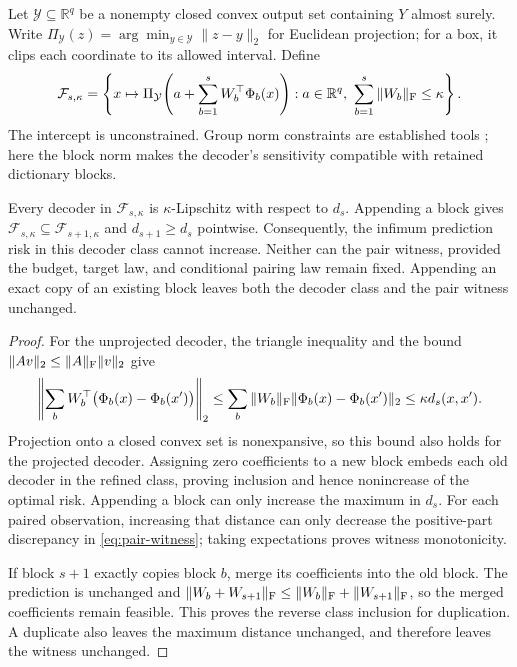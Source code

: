 Let $\mathcal Y\subseteq\mathbb R^q$ be a nonempty closed convex output
set containing $Y$ almost surely. Write
$\Pi_{\mathcal Y}(z)=\arg\min_{y\in\mathcal Y}\|z-y\|_2$ for Euclidean
projection; for a box, it clips each coordinate to its allowed interval.
Define
\begin{equation}
 \mathcal F_{s,\kappa}
 =\left\{x\mapsto\Pi_{\mathcal Y}\!\left(
       a+\sum_{b=1}^sW_b^\top\Phi_b(x)\right):
       a\in\mathbb R^q,\ \sum_{b=1}^s\|W_b\|_{\rm F}\leq\kappa\right\}.
 \label{eq:block-decoder}
\end{equation}
The intercept is unconstrained. Group norm constraints are established
tools \citep{bach2008group}; here the block norm makes the decoder's
sensitivity compatible with retained dictionary blocks.

\begin{theorem}
\label{thm:replication-invariance}
Every decoder in $\mathcal F_{s,\kappa}$ is $\kappa$-Lipschitz with
respect to $d_s$. Appending a block gives
$\mathcal F_{s,\kappa}\subseteq\mathcal F_{s+1,\kappa}$ and
$d_{s+1}\geq d_s$ pointwise. Consequently, the infimum prediction risk
in this decoder class cannot increase. Neither can the pair witness,
provided the budget, target law, and conditional pairing law remain fixed.
Appending an exact copy of an existing block leaves both the decoder
class and the pair witness unchanged.
\end{theorem}

\begin{proof}
For the unprojected decoder, the triangle inequality and the bound
$\|Av\|_2\leq\|A\|_{\rm F}\|v\|_2$ give
\[
 \left\|\sum_bW_b^\top\bigl(\Phi_b(x)-\Phi_b(x')\bigr)\right\|_2
 \leq\sum_b\|W_b\|_{\rm F}\|\Phi_b(x)-\Phi_b(x')\|_2
 \leq\kappa d_s(x,x').
\]
Projection onto a closed convex set is nonexpansive, so this bound also
holds for the projected decoder. Assigning zero coefficients to a new
block embeds each old decoder in the refined class, proving inclusion and
hence nonincrease of the optimal risk. Appending a block can only increase
the maximum in $d_s$. For each paired observation, increasing that distance
can only decrease the positive-part discrepancy in
\eqref{eq:pair-witness}; taking expectations proves witness monotonicity.

If block $s+1$ exactly copies block $b$, merge its coefficients into the
old block. The prediction is unchanged and
$\|W_b+W_{s+1}\|_{\rm F}\leq\|W_b\|_{\rm F}+\|W_{s+1}\|_{\rm F}$,
so the merged coefficients remain feasible. This proves the reverse
class inclusion for duplication. A duplicate also leaves the maximum
distance unchanged, and therefore leaves the witness unchanged.
\end{proof}

